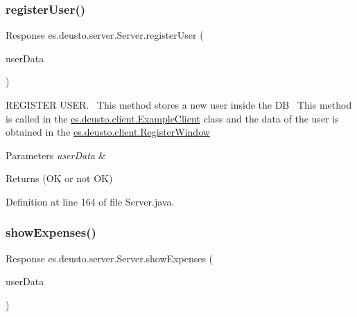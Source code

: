 \subsubsection{\texorpdfstring{register\+User()}{registerUser()}}
{\footnotesize\ttfamily Response es.\+deusto.\+server.\+Server.\+register\+User (\begin{DoxyParamCaption}\item[{\hyperlink{classes_1_1deusto_1_1serialization_1_1_user_data}{User\+Data}}]{user\+Data }\end{DoxyParamCaption})}

R\+E\+G\+I\+S\+T\+ER U\+S\+ER.~\newline
This method stores a new user inside the DB~\newline
This method is called in the \hyperlink{classes_1_1deusto_1_1client_1_1_example_client}{es.\+deusto.\+client.\+Example\+Client} class and the data of the user is obtained in the \hyperlink{classes_1_1deusto_1_1client_1_1_register_window}{es.\+deusto.\+client.\+Register\+Window}~\newline

\begin{DoxyParams}{Parameters}
{\em user\+Data} & \\
\hline
\end{DoxyParams}
\begin{DoxyReturn}{Returns}
(OK or not OK) 
\end{DoxyReturn}


Definition at line 164 of file Server.\+java.

\mbox{\label{classes_1_1deusto_1_1server_1_1_server_aa28b04cc2643cf60072fc2a680288cde}} 
\subsubsection{\texorpdfstring{show\+Expenses()}{showExpenses()}}
{\footnotesize\ttfamily Response es.\+deusto.\+server.\+Server.\+show\+Expenses (\begin{DoxyParamCaption}\item[{\hyperlink{classes_1_1deusto_1_1serialization_1_1_user_data}{User\+Data}}]{user\+Data }\end{DoxyParamCaption})}

